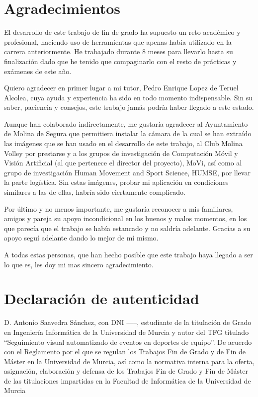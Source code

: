 \section*{Agradecimientos}

El desarrollo de este trabajo de fin de grado ha supuesto un reto académico y profesional, haciendo uso de herramientas que apenas había utilizado en la carrera anteriormente. He trabajado durante 8 meses para llevarlo hasta su finalización dado que he tenido que compaginarlo con el resto de prácticas y exámenes de este año.

Quiero agradecer en primer lugar a mi tutor, Pedro Enrique Lopez de Teruel Alcolea, cuya ayuda y experiencia ha sido en todo momento indispensable. Sin su saber, paciencia y consejos, este trabajo jamás podría haber llegado a este estado.

Aunque han colaborado indirectamente, me gustaría agradecer al Ayuntamiento de Molina de Segura que permitiera instalar la cámara de la cual se han extraído las imágenes que se han usado en el desarrollo de este trabajo, al Club Molina Volley por prestarse y a los grupos de investigación de Computación Móvil y Visión Artificial (al que pertenece el director del proyecto), MoVi, así como al grupo de investigación Human Movement and Sport Science, HUMSE, por llevar la parte logística. Sin estas imágenes, probar mi aplicación en condiciones similares a las de ellas, habría sido ciertamente complicado.

Por último y no menos importante, me gustaría reconocer a mis familiares, amigos y pareja su apoyo incondicional en los buenos y malos momentos, en los que parecía que el trabajo se había estancado y no saldría adelante. Gracias a su apoyo seguí adelante dando lo mejor de mí mismo.

A todas estas personas, que han hecho posible que este trabajo haya llegado a ser lo que es, les doy mi mas sincero agradecimiento.
\newpage
\section*{Declaración de autenticidad}

D. Antonio Saavedra Sánchez, con DNI -----, estudiante de la titulación de Grado en Ingeniería Informática de la Universidad de Murcia y autor del TFG titulado ``Seguimiento visual automatizado de eventos en deportes de equipo''. De acuerdo con el Reglamento por el que se regulan los Trabajos Fin de Grado y de Fin de Máster en la Universidad de Murcia, así como la normativa interna para la oferta, asignación, elaboración y defensa de los Trabajos Fin de Grado y Fin de Máster de las titulaciones impartidas en la Facultad de Informática de la Universidad de Murcia

